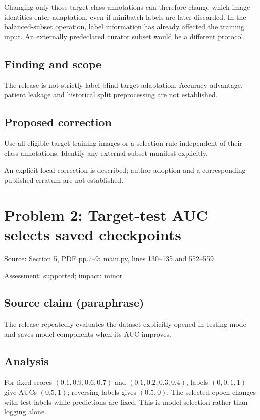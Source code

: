 \documentclass[11pt]{article}
\begin{document}
Changing only those target class annotations can therefore change which image identities enter adaptation, even if minibatch labels are later discarded. In the balanced-subset operation, label information has already affected the training input. An externally predeclared curator subset would be a different protocol.

\subsection*{Finding and scope}

The release is not strictly label-blind target adaptation. Accuracy advantage, patient leakage and historical split preprocessing are not established.

\subsection*{Proposed correction}

Use all eligible target training images or a selection rule independent of their class annotations. Identify any external subset manifest explicitly.

An explicit local correction is described; author adoption and a corresponding published erratum are not established.

\section*{Problem 2: Target-test AUC selects saved checkpoints}

Source: Section 5, PDF pp.7–9; main.py, lines 130–135 and 552–559

Assessment: supported; impact: minor

\subsection*{Source claim (paraphrase)}

The release repeatedly evaluates the dataset explicitly opened in testing mode and saves model components when its AUC improves.

\subsection*{Analysis}

For fixed scores \((0.1,0.9,0.6,0.7)\) and \((0.1,0.2,0.3,0.4)\), labels \((0,0,1,1)\) give AUCs \((0.5,1)\); reversing labels gives \((0.5,0)\). The selected epoch changes with test labels while predictions are fixed. This is model selection rather than logging alone.
\end{document}
